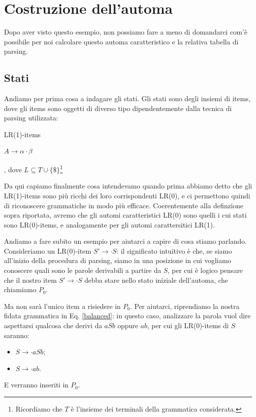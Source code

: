 \documentclass[class=book, crop=false, oneside, 12pt]{standalone}
\begin{document}
\section{Costruzione dell'automa}
Dopo aver visto questo esempio, non possiamo fare a meno di domandarci com'è possibile per noi calcolare questo automa caratteristico e la relativa tabella di parsing.

\subsection{Stati}
Andiamo per prima cosa a indagare gli stati. Gli stati sono degli insiemi di items, dove gli items sono oggetti di diverso tipo dipendentemente dalla tecnica di parsing utilizzata:
\begin{labeling}{LR(1)-items}
    \item[LR(0)-items] \(A \to \alpha \cdot \beta\)
    \item[LR(1)-items] [\(A \to \alpha \cdot \beta, L\)], dove \(L \subseteq T \cup \{\$\}\)\footnote{Ricordiamo che \(T\) è l'insieme dei terminali della grammatica considerata.}
\end{labeling}
Da qui capiamo finalmente cosa intendevamo quando prima abbiamo detto che gli LR(1)-items sono più ricchi dei loro corrispondenti LR(0), e ci permettono quindi di riconoscere grammatiche in modo più efficace. Coerentemente alla definzione sopra riportata, avremo che gli automi caratteristici LR(0) sono quelli i cui stati sono LR(0)-items, e analogamente per gli automi carattersitici LR(1).

Andiamo a fare subito un esempio per aiutarci a capire di cosa stiamo parlando. Consideriamo un LR(0)-item \(S' \to \cdot S\): il significato intuitivo è che, se siamo all'inizio della procedura di parsing, siamo in una posizione in cui vogliamo conoscere quali sono le parole derivabili a partire da \(S\), per cui è logico pensare che il nostro item \(S' \to \cdot S\) debba stare nello stato iniziale dell'automa, che chiamiamo \(P_0\).

Ma non sarà l'unico item a risiedere in \(P_0\). Per aiutarci, riprendiamo la nostra fidata grammatica in Eq. \ref{balanced}: in questo caso, analizzare la parola vuol dire aspettarsi qualcosa che derivi da \(aSb\) oppure \(ab\), per cui gli LR(0)-items di \(S\) saranno:
\begin{itemize}
    \item \(S \to \cdot aSb\);
    \item \(S \to \cdot ab\).
\end{itemize}
E verranno inseriti in \(P_0\).
\end{document}
